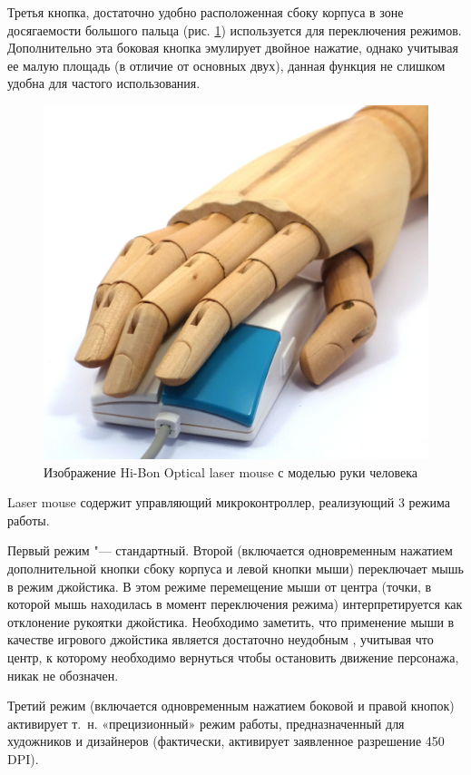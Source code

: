 \documentclass[11pt, a4paper]{article}
\begin{document}
Третья кнопка, достаточно удобно расположенная сбоку корпуса в зоне досягаемости большого пальца (рис. \ref{fig:OpticalLaserMouseHand}) используется для переключения режимов. Дополнительно эта боковая кнопка эмулирует двойное нажатие, однако учитывая ее малую площадь (в отличие от основных двух), данная функция не слишком удобна для частого использования.

\begin{figure}[h]
    \centering
    \includegraphics[scale=0.3]{1996_hi-bon_laser_mouse/hand_60.jpg}
    \caption{Изображение Hi-Bon Optical laser mouse с моделью руки человека}
    \label{fig:OpticalLaserMouseHand}
\end{figure}

Laser mouse содержит управляющий микроконтроллер, реализующий 3 режима работы.

Первый режим "--- стандартный. Второй (включается одновременным нажатием дополнительной кнопки сбоку корпуса и левой кнопки мыши) переключает мышь в режим джойстика. В этом режиме перемещение мыши от центра (точки, в которой мышь находилась в момент переключения режима) интерпретируется как отклонение рукоятки джойстика. Необходимо заметить, что применение мыши в качестве игрового джойстика является достаточно неудобным \cite{LittleMagick}, учитывая что центр, к которому необходимо вернуться чтобы остановить движение персонажа, никак не обозначен.

Третий режим (включается одновременным нажатием боковой и правой кнопок) активирует т.~н. «прецизионный» режим работы, предназначенный для художников и дизайнеров (фактически, активирует заявленное разрешение 450 DPI).
\end{document}
